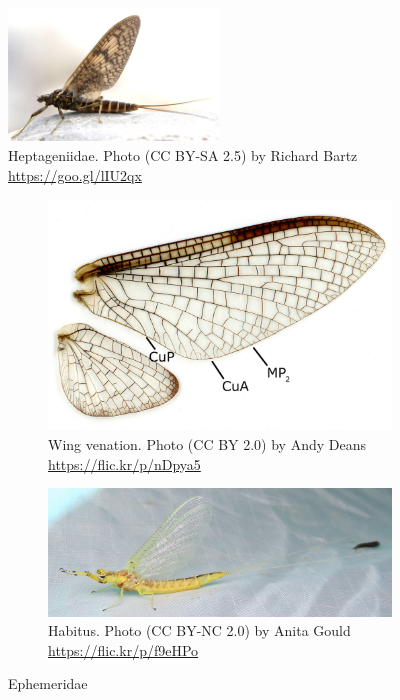 \documentclass[letterpaper, 11pt]{article}
\begin{document}
\begin{figure}[ht!]
  \centering
    \includegraphics[width=0.5\textwidth]{HeptageniidHabitus}
  \caption{Heptageniidae. Photo (CC BY-SA 2.5) by Richard Bartz \url{https://goo.gl/lIU2qx}}
  \label{fig:heptageniid}
\end{figure}

\begin{figure}[ht!]
    \centering
    \begin{subfigure}[ht!]{0.35\textwidth}
        \includegraphics[width=\textwidth]{EphemeridWings}
        \caption{Wing venation. Photo (CC BY 2.0) by Andy Deans \url{https://flic.kr/p/nDpya5}}
        \label{fig:ephemwing}
    \end{subfigure}
    \hfill
    \begin{subfigure}[ht!]{0.60\textwidth}
        \includegraphics[width=\textwidth]{ephemeridbody}
        \caption{Habitus. Photo (CC BY-NC 2.0) by Anita Gould \url{https://flic.kr/p/f9eHPo}}
        \label{fig:ephemeridbody}
    \end{subfigure}
    \caption{Ephemeridae}\label{fig:ephemerid}
\end{figure}
\end{document}
